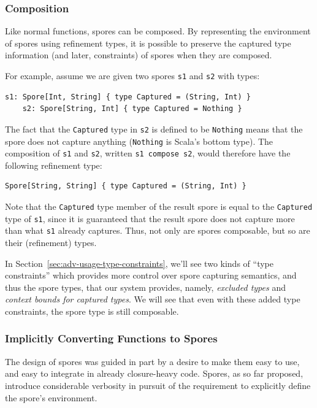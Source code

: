 \documentclass{llncs}
\begin{document}
\subsubsection{Composition}

Like normal functions, spores can be composed. By representing the environment
of spores using refinement types, it is possible to preserve the captured type
information (and later, constraints) of spores when they are composed.

For example, assume we are given two spores \verb|s1| and \verb|s2| with types:

\begin{lstlisting}[numbers=none]
    s1: Spore[Int, String] { type Captured = (String, Int) }
    s2: Spore[String, Int] { type Captured = Nothing }
\end{lstlisting}

\noindent The fact that the \verb|Captured| type in \verb|s2| is defined to be
\verb|Nothing| means that the spore does not capture anything (\verb|Nothing|
is Scala's bottom type). The composition of \verb|s1| and \verb|s2|, written
\verb|s1 compose s2|, would therefore have the following refinement type:

\begin{lstlisting}[numbers=none]
    Spore[String, String] { type Captured = (String, Int) }
\end{lstlisting}

Note that the \verb|Captured| type member of the result spore is equal to the
\verb|Captured| type of \verb|s1|, since it is guaranteed that the result
spore does not capture more than what \verb|s1| already captures. Thus, not
only are spores composable, but so are their (refinement) types.

In Section~\ref{sec:adv-usage-type-constraints}, we'll see two kinds of ``type
constraints'' which provides more control over spore capturing semantics, and
thus the spore types, that our system provides, namely, {\em excluded types} and
{\em context bounds for captured types}. We will see that even with these added type constraints, the spore type is still composable.

\subsubsection{Implicitly Converting Functions to Spores}

The design of spores was guided in part by a desire to make them easy to use,
and easy to integrate in already closure-heavy code. Spores, as so far
proposed, introduce considerable verbosity in pursuit of the requirement to
explicitly define the spore's environment.
\end{document}
